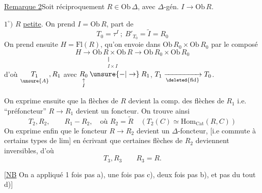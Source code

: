 
\uline{Remarque 2}\quad Soit réciproquement $R\in\mathrm{Ob}\,\Delta$, avec $\Delta$-gén. $I\to\mathrm{Ob}\,R$.  

$1^\circ)$ $R$ \uline{petite}. On prend $I=\mathrm{Ob}\,R$,  part de
\[
T_0=\tau^I\ ;\ B'_{T_0}=\widetilde I=R_0
\]
On prend ensuite $H=\mathrm{Fl}(R)$, qu'on envoie dans $\mathrm{Ob}\,R_0\times\mathrm{Ob}\,R_0$ par le composé
\[
 H\longrightarrow\underset{\substack{\Vert\\I\times I}}{\mathrm{Ob}\,R\times\mathrm{Ob}\,R}
 \longrightarrow\mathrm{Ob}\,R_0\times\mathrm{Ob}\,R_0
\]
d'où $\underset{\unsure{A}}{T_1},R_1$ avec $\underset{\substack{\uparrow\\ I}}{R_0}\mathbin{\unsure{-|\to}}R_1$, $T_1\xrightarrow[\deleted{\mathrm{fid}}]{}T_0$.


On exprime ensuite que la  flèches de $R$ devient la comp. des flèches de $R_1$ i.e.  ``préfoncteur'' $R\to R_1$ devient un foncteur. On trouve ainsi
\[
T_2,R_2,\qquad R_1\mathbin{-}R_2,\quad\text{où }R_2=\widetilde R
\quad(T_2(C)\simeq\mathrm{Hom}_{\mathrm{Cat}}(R,C))
\]
On exprime enfin que le foncteur $R\to R_2$ devient un $\Delta$-foncteur,  [i.e commute à certains types de lim] en écrivant que certaines flèches de $R_2$ deviennent inversibles, d'où
\[
 T_3,R_3\qquad R_3=R .
\]

[\uline{NB} On a appliqué 1 fois pas a), une fois pas c), deux fois pas b), et pas du tout d)]

